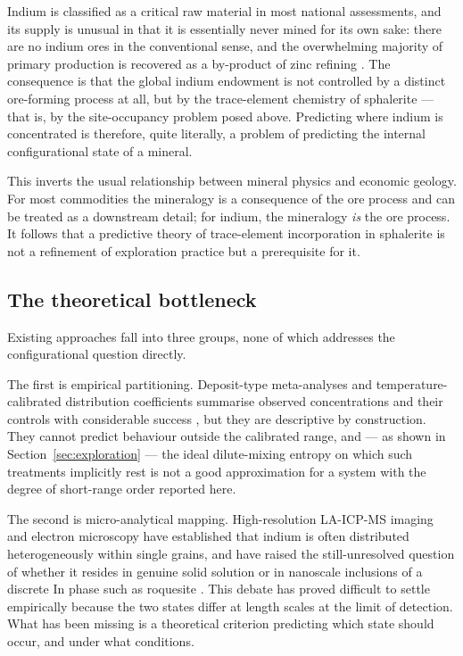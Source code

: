 \documentclass[11pt,a4paper]{article}
\begin{document}
Indium is classified as a critical raw material in most national assessments,
and its supply is unusual in that it is essentially never mined for its own
sake: there are no indium ores in the conventional sense, and the overwhelming
majority of primary production is recovered as a by-product of zinc refining
\citep{werner2015,usgs2024}. The consequence is
that the global indium endowment is not controlled by a distinct ore-forming
process at all, but by the trace-element chemistry of sphalerite --- that is, by
the site-occupancy problem posed above. Predicting where indium is concentrated
is therefore, quite literally, a problem of predicting the internal
configurational state of a mineral.

This inverts the usual relationship between mineral physics and economic
geology. For most commodities the mineralogy is a consequence of the ore process
and can be treated as a downstream detail; for indium, the mineralogy \emph{is}
the ore process. It follows that a predictive theory of trace-element
incorporation in sphalerite is not a refinement of exploration practice but a
prerequisite for it.

\subsection{The theoretical bottleneck}

Existing approaches fall into three groups, none of which addresses the
configurational question directly.

The first is empirical partitioning. Deposit-type meta-analyses and
temperature-calibrated distribution coefficients summarise observed
concentrations and their controls with considerable success
\citep{frenzel2016}, but they are
descriptive by construction. They cannot predict behaviour outside the
calibrated range, and --- as shown in Section~\ref{sec:exploration} --- the
ideal dilute-mixing entropy on which such treatments implicitly rest is not a
good approximation for a system with the degree of short-range order reported
here.

The second is micro-analytical mapping. High-resolution LA-ICP-MS imaging and
electron microscopy have established that indium is often distributed
heterogeneously within single grains, and have raised the still-unresolved
question of whether it resides in genuine solid solution or in nanoscale
inclusions of a discrete In phase such as roquesite \citep{moura2007}.
This debate has proved difficult to settle empirically because the two states
differ at length scales at the limit of detection. What has been missing is a
theoretical criterion predicting which state should occur, and under what
conditions.
\end{document}

